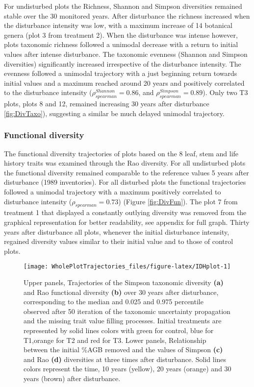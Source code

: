 \documentclass[fleqn,10pt]{ArtEcoFoG} %
\theoremstyle{definition}
\theoremstyle{definition}
\theoremstyle{definition}
\theoremstyle{remark}
\begin{document}
For undisturbed plots the Richness, Shannon and Simpson diversities
remained stable over the 30 monitored years. After disturbance the
richness increased when the disturbance intensity was low, with a
maximum increase of 14 botanical genera (plot 3 from treatment 2). When
the disturbance was intense however, plots taxonomic richness followed a
unimodal decrease with a return to initial values after intense
disturbance. The taxonomic evenness (Shannon and Simpson diversities)
significantly increased irrespective of the disturbance intensity. The
evenness followed a unimodal trajectory with a just beginning return
towards initial values and a maximum reached around 20 years and
positively correlated to the disturbance intensity
(\(\rho_{spearman}^{Shannon}=0.86\), and
\(\rho_{spearman}^{Simpson}=0.89\)). Only two T3 plots, plots 8 and 12,
remained increasing 30 years after disturbance \ref{fig:DivTaxo}),
suggesting a similar be much delayed unimodal trajectory.

\subsubsection{Functional diversity}\label{functional-diversity}

The functional diversity trajectories of plots based on the 8 leaf, stem
and life history traits was examined through the Rao diversity. For all
undisturbed plots the functional diversity remained comparable to the
reference values 5 years after disturbance (1989 inventories). For all
disturbed plots the functional trajectories followed a unimodal
trajectory with a maximum positively correlated to disturbance intensity
(\(\rho_{spearman}=0.73\)) (Figure \ref{fig:DivFun}). The plot 7 from
treatment 1 that displayed a constantly outlying diversity was removed
from the graphical representation for better readability, see appendix
for full graph. Thirty years after disturbance all plots, whenever the
initial disturbance intensity, regained diversity values similar to
their initial value and to those of control plots.

\begin{figure*}

{\centering \texttt{[image: WholePlotTrajectories\_files/figure-latex/IDHplot-1]} 

}

\caption{Upper panels, Trajectories of the Simpson taxonomic diversity \textbf{(a)} and Rao functional diversity \textbf{(b)} over 30 years after disturbance, corresponding to the median and 0.025 and 0.975 percentile observed after 50 iteration of the taxonomic uncertainty propagation and the missing trait value filling processes. Initial treatments are represented by solid lines colors with green for control, blue for T1,orange for T2 and red for T3. Lower panels, Relationship between the initial \%AGB removed and the values of Simpson \textbf{(c)} and Rao \textbf{(d)} diversities at three times after disturbance. Solid lines colors represent the time, 10 years (yellow), 20 years (orange) and 30 years (brown) after disturbance.}\label{fig:IDHplot}
\end{figure*}
\end{document}
